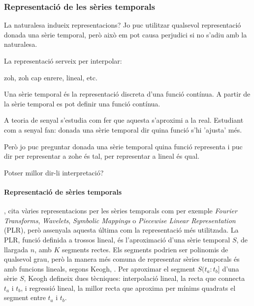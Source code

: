 








\subsubsection{Representació de les sèries temporals}



La naturalesa indueix representacions?
Jo puc utilitzar qualsevol representació donada una sèrie temporal, però això em pot causa perjudici si no s'adiu amb la naturalesa.


La representació serveix per interpolar:

zoh, zoh cap enrere, lineal, etc.


Una sèrie temporal és la representació discreta d'una funció contínua. A partir de la sèrie temporal es pot definir una funció contínua. 

A teoria de senyal s'estudia com fer que aquesta s'aproximi a la real. Estudiant com a senyal fan: donada una sèrie temporal dir quina funció s'hi 'ajusta' més. 

Però jo puc preguntar donada una sèrie temporal quina funció representa i puc dir per representar a zohe és tal, per representar a lineal és qual. 

Potser millor dir-li interpretació?



\paragraph{Representació de sèries temporals}

\textcite{last:keogh}, cita vàries representacions per les sèries temporals com per exemple \emph{Fourier Transforms}, \emph{Wavelets}, \emph{Symbolic Mappings} o \emph{Piecewise Linear Representation} (PLR), però assenyala aquesta última com la representació més utilitzada. 
La PLR, funció definida a trossos lineal, és l'aproximació d'una sèrie temporal $S$, de llargada $n$, amb $K$ segments rectes. Els segments podrien ser polinomis de qualsevol grau, però la manera més comuna de representar sèries temporals és amb funcions lineals, segons Keogh, \cite{keogh02}.
Per aproximar el segment $S(t_a:t_b]$ d'una sèrie $S$, Keogh defineix dues tècniques: interpolació lineal, la recta que connecta $t_a$ i $t_b$, i regressió lineal, la millor recta que aproxima per mínims quadrats el segment entre $t_a$ i $t_b$.

